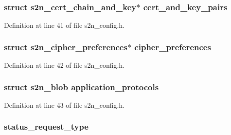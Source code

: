 \subsubsection[{\texorpdfstring{cert\+\_\+and\+\_\+key\+\_\+pairs}{cert_and_key_pairs}}]{\setlength{\rightskip}{0pt plus 5cm}struct {\bf s2n\+\_\+cert\+\_\+chain\+\_\+and\+\_\+key}$\ast$ cert\+\_\+and\+\_\+key\+\_\+pairs}\hypertarget{structs2n__config_acd0d45f80129861144d237591eee6c5f}{}\label{structs2n__config_acd0d45f80129861144d237591eee6c5f}


Definition at line 41 of file s2n\+\_\+config.\+h.

\subsubsection[{\texorpdfstring{cipher\+\_\+preferences}{cipher_preferences}}]{\setlength{\rightskip}{0pt plus 5cm}struct {\bf s2n\+\_\+cipher\+\_\+preferences}$\ast$ cipher\+\_\+preferences}\hypertarget{structs2n__config_a2cdf2a56849d48a020a71d6e8d03d9cf}{}\label{structs2n__config_a2cdf2a56849d48a020a71d6e8d03d9cf}


Definition at line 42 of file s2n\+\_\+config.\+h.

\subsubsection[{\texorpdfstring{application\+\_\+protocols}{application_protocols}}]{\setlength{\rightskip}{0pt plus 5cm}struct {\bf s2n\+\_\+blob} application\+\_\+protocols}\hypertarget{structs2n__config_a45182f90f146494a0f2dc4c962bbba0e}{}\label{structs2n__config_a45182f90f146494a0f2dc4c962bbba0e}


Definition at line 43 of file s2n\+\_\+config.\+h.

\subsubsection[{\texorpdfstring{status\+\_\+request\+\_\+type}{status_request_type}}]{ status\+\_\+request\+\_\+type}\hypertarget{structs2n__config_aa6c7e4f4cf13d4d133b66760cf0d09fa}{}\label{structs2n__config_aa6c7e4f4cf13d4d133b66760cf0d09fa}


